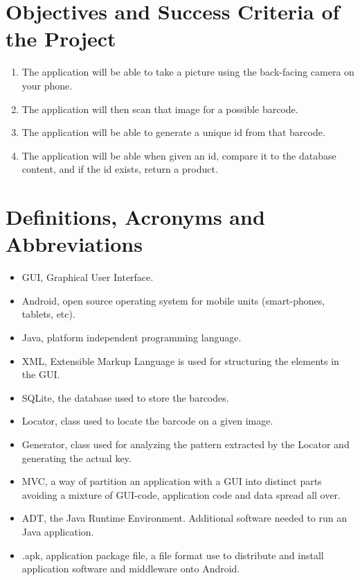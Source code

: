 \documentclass{report}
\begin{document}
\section{Objectives and Success Criteria of the Project}

\begin{enumerate}
  \item The application will be able to take a picture using the back-facing camera on your phone.
  \item The application will then scan that image for a possible barcode.
  \item The application will be able to generate a unique id from that barcode.
  \item The application will be able when given an id, compare it to the database content, and if the id exists, return a product.
\end{enumerate}

\section{Definitions, Acronyms and Abbreviations}

\begin{itemize}
    \item{GUI}, Graphical User Interface.
    \item{Android}, open source operating system for mobile units (smart-phones, tablets, etc).
    \item{Java}, platform independent programming language.
    \item{XML}, Extensible Markup Language is used for structuring the elements in the GUI.
    \item{SQLite}, the database used to store the barcodes.
    \item{Locator}, class used to locate the barcode on a given image.
    \item{Generator}, class used for analyzing the pattern extracted by the Locator and generating the actual key.
    \item{MVC}, a way of partition an application with a GUI into distinct parts avoiding a mixture of GUI-code, application code and data spread all over.
    \item{ADT}, the Java Runtime Environment. Additional software needed to run an Java application.
    \item{.apk}, application package file, a file format use to distribute and install application software and middleware onto Android.
\end{itemize}
\end{document}
